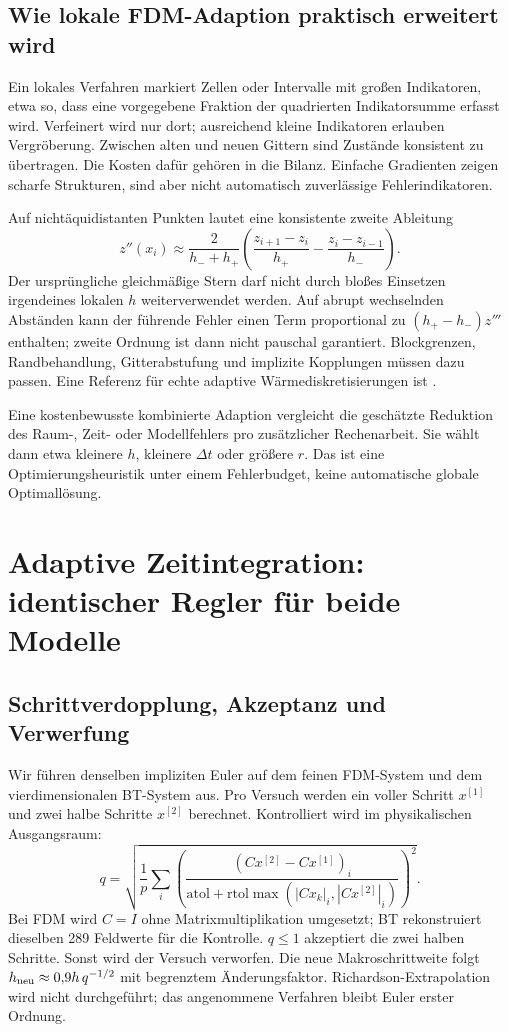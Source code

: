 \subsection{Wie lokale FDM-Adaption praktisch erweitert wird}
Ein lokales Verfahren markiert Zellen oder Intervalle mit großen Indikatoren, etwa so, dass eine vorgegebene Fraktion der quadrierten Indikatorsumme erfasst wird. Verfeinert wird nur dort; ausreichend kleine Indikatoren erlauben Vergröberung. Zwischen alten und neuen Gittern sind Zustände konsistent zu übertragen. Die Kosten dafür gehören in die Bilanz. Einfache Gradienten zeigen scharfe Strukturen, sind aber nicht automatisch zuverlässige Fehlerindikatoren.

Auf nichtäquidistanten Punkten lautet eine konsistente zweite Ableitung
\begin{equation}
 z''(x_i)\approx\frac{2}{h_-+h_+}
 \left(\frac{z_{i+1}-z_i}{h_+}-\frac{z_i-z_{i-1}}{h_-}\right).
\end{equation}
Der ursprüngliche gleichmäßige Stern darf nicht durch bloßes Einsetzen irgendeines lokalen $h$ weiterverwendet werden. Auf abrupt wechselnden Abständen kann der führende Fehler einen Term proportional zu $(h_+-h_-)z'''$ enthalten; zweite Ordnung ist dann nicht pauschal garantiert. Blockgrenzen, Randbehandlung, Gitterabstufung und implizite Kopplungen müssen dazu passen. Eine Referenz für echte adaptive Wärmediskretisierungen ist \cite{hybrid}.

Eine kostenbewusste kombinierte Adaption vergleicht die geschätzte Reduktion des Raum-, Zeit- oder Modellfehlers pro zusätzlicher Rechenarbeit. Sie wählt dann etwa kleinere $h$, kleinere $\Delta t$ oder größere $r$. Das ist eine Optimierungsheuristik unter einem Fehlerbudget, keine automatische globale Optimallösung.

\section{Adaptive Zeitintegration: identischer Regler für beide Modelle}
\subsection{Schrittverdopplung, Akzeptanz und Verwerfung}
Wir führen denselben impliziten Euler auf dem feinen FDM-System und dem vierdimensionalen BT-System aus. Pro Versuch werden ein voller Schritt $x^{[1]}$ und zwei halbe Schritte $x^{[2]}$ berechnet. Kontrolliert wird im physikalischen Ausgangsraum:
\begin{equation}
 q=\sqrt{\frac1p\sum_i\left(
 \frac{(C x^{[2]}-C x^{[1]})_i}
 {\mathrm{atol}+\mathrm{rtol}\max(|Cx_k|_i,|Cx^{[2]}|_i)}\right)^2}.
\end{equation}
Bei FDM wird $C=I$ ohne Matrixmultiplikation umgesetzt; BT rekonstruiert dieselben 289 Feldwerte für die Kontrolle. $q\le1$ akzeptiert die zwei halben Schritte. Sonst wird der Versuch verworfen. Die neue Makroschrittweite folgt $h_{\rm neu}\approx0{,}9h\,q^{-1/2}$ mit begrenztem Änderungsfaktor. Richardson-Extrapolation wird nicht durchgeführt; das angenommene Verfahren bleibt Euler erster Ordnung.

